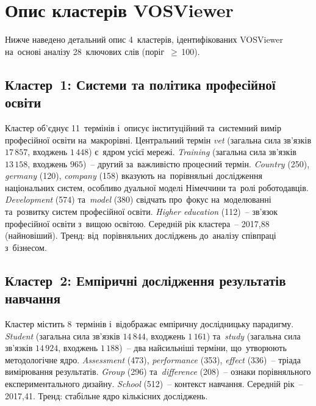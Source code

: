 \begin{landscape}
\begin{table}[htbp]
\centering
\caption{Повна таблиця порівняння метрик VOSViewer та~Python.}
\label{tab:full_comparison}
\scriptsize

\end{table}
\end{landscape}


\clearpage
\section{Опис кластерів VOSViewer}
\label{app:clusters}

Нижче наведено детальний опис 4~кластерів, ідентифікованих VOSViewer на~основі аналізу 28~ключових слів (поріг~$\geq$\,100).

\subsection*{Кластер~1: Системи та політика професійної освіти}

Кластер об'єднує 11~термінів і~описує інституційний та~системний вимір професійної освіти на~макрорівні. Центральний термін \textit{vet} (загальна сила зв'язків $17\,857$, входжень $1\,448$) є~ядром усієї мережі. \textit{Training} (загальна сила зв'язків $13\,158$, входжень $965$)~-- другий за~важливістю процесний термін. \textit{Country} (250), \textit{germany} (120), \textit{company} (158) вказують на~порівняльні дослідження національних систем, особливо дуальної моделі Німеччини та~ролі роботодавців. \textit{Development} (574) та~\textit{model} (380) свідчать про~фокус на~моделюванні та~розвитку систем професійної освіти. \textit{Higher education} (112)~-- зв'язок професійної освіти з~вищою освітою. Середній рік кластера~-- 2017,88 (найновіший). Тренд: від~порівняльних досліджень до~аналізу співпраці з~бізнесом.

\subsection*{Кластер~2: Емпіричні дослідження результатів навчання}

Кластер містить 8~термінів і~відображає емпіричну дослідницьку парадигму. \textit{Student} (загальна сила зв'язків $14\,844$, входжень $1\,161$) та~\textit{study} (загальна сила зв'язків $14\,924$, входжень $1\,188$)~-- два найсильніші терміни, що~утворюють методологічне ядро. \textit{Assessment} (473), \textit{performance} (353), \textit{effect} (336)~-- тріада вимірювання результатів. \textit{Group} (296) та~\textit{difference} (208)~-- ознаки порівняльного експериментального дизайну. \textit{School} (512)~-- контекст навчання. Середній рік~-- 2017,41. Тренд: стабільне ядро кількісних досліджень.

